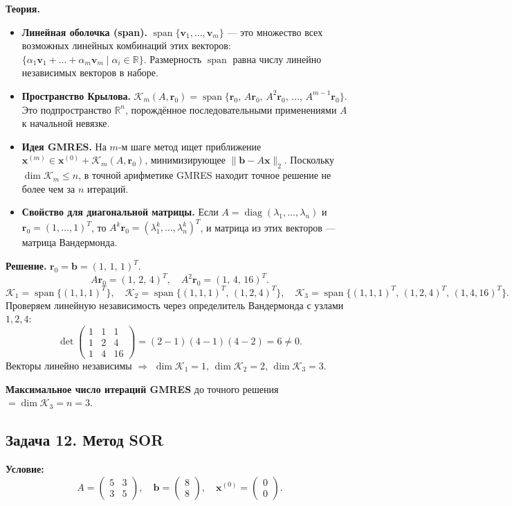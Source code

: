\documentclass{article}
\begin{document}
\textbf{Теория.}
\begin{itemize}
    \item \textbf{Линейная оболочка (span).} $\operatorname{span}\{\textbf{v}_1,\dots,\textbf{v}_m\}$ --- это множество всех возможных линейных комбинаций этих векторов: $\{\alpha_1\textbf{v}_1+\dots+\alpha_m\textbf{v}_m \mid \alpha_i\in\mathbb{R}\}$. Размерность $\operatorname{span}$ равна числу линейно независимых векторов в наборе.
    \item \textbf{Пространство Крылова.} $\mathcal{K}_m(A,\textbf{r}_0) = \operatorname{span}\{\textbf{r}_0,\, A\textbf{r}_0,\, A^2\textbf{r}_0,\, \dots,\, A^{m-1}\textbf{r}_0\}$. Это подпространство $\mathbb{R}^n$, порождённое последовательными применениями $A$ к начальной невязке.
    \item \textbf{Идея GMRES.} На $m$-м шаге метод ищет приближение $\textbf{x}^{(m)} \in \textbf{x}^{(0)} + \mathcal{K}_m(A,\textbf{r}_0)$, минимизирующее $\|\textbf{b}-A\textbf{x}\|_2$. Поскольку $\dim\mathcal{K}_m \le n$, в точной арифметике GMRES находит точное решение не более чем за $n$ итераций.
    \item \textbf{Свойство для диагональной матрицы.} Если $A = \operatorname{diag}(\lambda_1,\dots,\lambda_n)$ и $\textbf{r}_0 = (1,\dots,1)^T$, то $A^k\textbf{r}_0 = (\lambda_1^k,\dots,\lambda_n^k)^T$, и матрица из этих векторов --- матрица Вандермонда.
\end{itemize}

\textbf{Решение.} $\textbf{r}_0 = \textbf{b} = (1,\, 1,\, 1)^T$.
$$A\textbf{r}_0 = (1,\, 2,\, 4)^T, \quad A^2\textbf{r}_0 = (1,\, 4,\, 16)^T.$$
$$\mathcal{K}_1 = \operatorname{span}\{(1,1,1)^T\}, \quad \mathcal{K}_2 = \operatorname{span}\{(1,1,1)^T,\,(1,2,4)^T\}, \quad \mathcal{K}_3 = \operatorname{span}\{(1,1,1)^T,\,(1,2,4)^T,\,(1,4,16)^T\}.$$
Проверяем линейную независимость через определитель Вандермонда с узлами $1,2,4$:
$$\det\begin{pmatrix} 1 & 1 & 1 \\ 1 & 2 & 4 \\ 1 & 4 & 16 \end{pmatrix} = (2-1)(4-1)(4-2) = 6 \neq 0.$$
Векторы линейно независимы $\Rightarrow$ $\dim\mathcal{K}_1=1$, $\dim\mathcal{K}_2=2$, $\dim\mathcal{K}_3=3$.

\textbf{Максимальное число итераций GMRES} до точного решения $= \dim\mathcal{K}_3 = n = 3$.

\subsection*{Задача 12. Метод SOR}
\textbf{Условие:}
$$
A = \begin{pmatrix} 5 & 3 \\ 3 & 5 \end{pmatrix}, \quad 
\textbf{b} = \begin{pmatrix} 8 \\ 8 \end{pmatrix}, \quad 
\textbf{x}^{(0)} = \begin{pmatrix} 0 \\ 0 \end{pmatrix}.
$$
\end{document}
